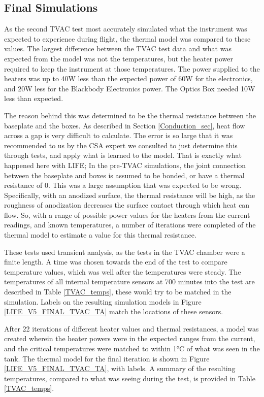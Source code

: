 \subsection{Final Simulations}
As the second TVAC test most accurately simulated what the instrument was expected to experience during flight, the thermal model was compared to these values. The largest difference between the TVAC test data and what was expected from the model was not the temperatures, but the heater power required to keep the instrument at those temperatures. The power supplied to the heaters was up to 40W less than the expected power of 60W for the electronics, and 20W less for the Blackbody Electronics power. The Optics Box needed 10W less than expected.

The reason behind this was determined to be the thermal resistance between the baseplate and the boxes. As described in Section \ref{Conduction_sec}, heat flow across a gap is very difficult to calculate. The error is so large that it was recommended to us by the CSA expert we consulted to just determine this through tests, and apply what is learned to the model. That is exactly what happened here with LIFE; In the pre-TVAC simulations, the joint connection between the baseplate and boxes is assumed to be bonded, or have a thermal resistance of 0. This was a large assumption that was expected to be wrong. Specifically, with an anodized surface, the thermal resistance will be high, as the roughness of anodization decreases the surface contact through which heat can flow. So, with a range of possible power values for the heaters from the current readings, and known temperatures, a number of iterations were completed of the thermal model to estimate a value for this thermal resistance. 

These tests used transient analysis, as the tests in the TVAC chamber were a finite length. A time was chosen towards the end of the test to compare temperature values, which was well after the temperatures were steady. The temperatures of all internal temperature sensors at 700 minutes into the test are described in Table \ref{TVAC_temps}, these would try to be matched in the simulation. Labels on the resulting simulation models in Figure \ref{LIFE_V5_FINAL_TVAC_TA} match the locations of these sensors.

After 22 iterations of different heater values and thermal resistances, a model was created wherein the heater powers were in the expected ranges from the current, and the critical temperatures were matched to within 1°C of what was seen in the tank. The thermal model for the final iteration is shown in Figure \ref{LIFE_V5_FINAL_TVAC_TA}, with labels. A summary of the resulting temperatures, compared to what was seeing during the test, is provided in Table \ref{TVAC_temps}.


